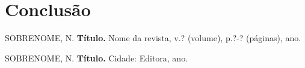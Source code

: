 \documentclass[12pt,oneside]{book} %
\begin{document}





    \chapter{Conclusão}
    \thispagestyle{empty}










    \begin{thebibliography}{99}
    \thispagestyle{empty}

     SOBRENOME, N. {\bf Título.} Nome da revista, v.? (volume), p.?-? (páginas), ano. %
    
     SOBRENOME, N. {\bf Título.} Cidade: Editora, ano. %

    \end{thebibliography}





\end{document}
